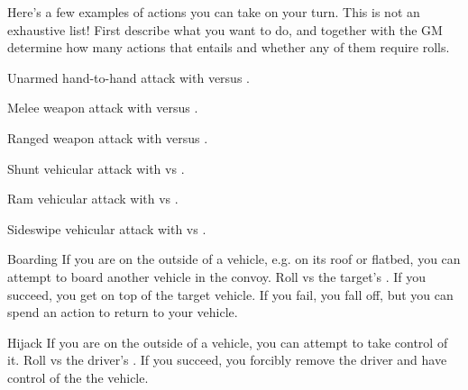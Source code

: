 
Here's a few examples of actions you can take on your turn. This is not an exhaustive list! First describe what you want to do, and together with the GM determine how many actions that entails and whether any of them require rolls.

\begin{describe}{Unarmed hand-to-hand}
  attack with  versus .
\end{describe}

\begin{describe}{Melee weapon}
  attack with  versus .
\end{describe}

\begin{describe}{Ranged weapon}
  attack with  versus .
\end{describe}

\hr

\begin{describe}{Shunt}
  vehicular attack with  vs .
\end{describe}

\begin{describe}{Ram}
  vehicular attack with  vs .
\end{describe}

\begin{describe}{Sideswipe}
  vehicular attack with  vs .
\end{describe}

\hr

\begin{describe}{Boarding}
  If you are on the outside of a vehicle, e.g. on its roof or flatbed, you can attempt to board another vehicle in the convoy. Roll  vs the target's . If you succeed, you get on top of the target vehicle. If you fail, you fall off, but you can spend an action to return to your vehicle.
\end{describe}

\begin{describe}{Hijack}
  If you are on the outside of a vehicle, you can attempt to take control of it. Roll  vs the driver's . If you succeed, you forcibly remove the driver and have control of the the vehicle.
\end{describe}

